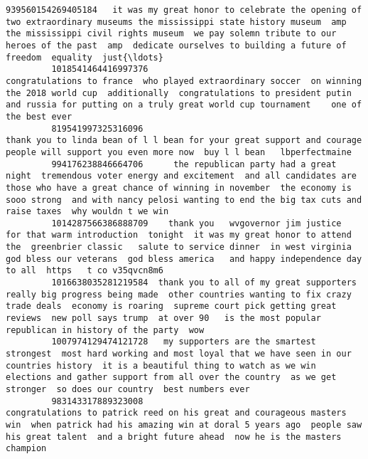 \documentclass[11pt]{article}
\begin{document}
\begin{Verbatim}[commandchars=\\\{\}]
         939560154269405184   it was my great honor to celebrate the opening of two extraordinary museums the mississippi state history museum  amp  the mississippi civil rights museum  we pay solemn tribute to our heroes of the past  amp  dedicate ourselves to building a future of freedom  equality  just{\ldots}   
         1018541464416997376                                                        congratulations to france  who played extraordinary soccer  on winning the 2018 world cup  additionally  congratulations to president putin and russia for putting on a truly great world cup tournament    one of the best ever    
         819541997325316096                                                                                                                                              thank you to linda bean of l l bean for your great support and courage  people will support you even more now  buy l l bean   lbperfectmaine   
         994176238846664706      the republican party had a great night  tremendous voter energy and excitement  and all candidates are those who have a great chance of winning in november  the economy is sooo strong  and with nancy pelosi wanting to end the big tax cuts and raise taxes  why wouldn t we win    
         1014287566386888709    thank you   wvgovernor jim justice  for that warm introduction  tonight  it was my great honor to attend the  greenbrier classic   salute to service dinner  in west virginia  god bless our veterans  god bless america   and happy independence day to all  https   t co v35qvcn8m6   
         1016638035281219584  thank you to all of my great supporters  really big progress being made  other countries wanting to fix crazy trade deals  economy is roaring  supreme court pick getting great reviews  new poll says trump  at over 90   is the most popular republican in history of the party  wow    
         1007974129474121728   my supporters are the smartest  strongest  most hard working and most loyal that we have seen in our countries history  it is a beautiful thing to watch as we win elections and gather support from all over the country  as we get stronger  so does our country  best numbers ever    
         983143317889323008                                                                   congratulations to patrick reed on his great and courageous masters win  when patrick had his amazing win at doral 5 years ago  people saw his great talent  and a bright future ahead  now he is the masters champion    
         

\end{Verbatim}
\end{document}

